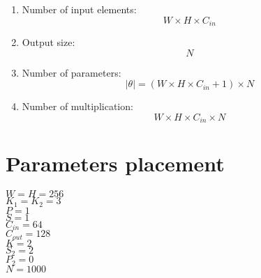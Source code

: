 \documentclass[a4paper]{article}
\begin{document}
\begin{enumerate}
    \item Number of input elements: 
        $$W \times H \times C_{in}$$
    \item Output size:
        $$N$$
    \item Number of parameters:
        $$|\theta| = (W \times H \times C_{in} + 1) \times N$$
    \item Number of multiplication:
        $$W \times H \times C_{in} \times N$$
\end{enumerate}

\section{Parameters placement}
$W = H = 256$ \\
$K_1 = K_2 = 3$ \\
$P = 1$ \\
$S = 1$ \\
$C_{in} = 64$ \\
$C_{out} = 128$ \\
$K = 2$ \\
$S_2 = 2$ \\
$P_2 = 0$ \\
$N = 1000$ \\
\end{document}
